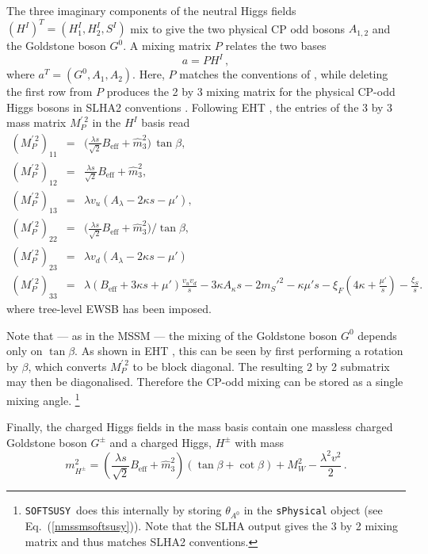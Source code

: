 \documentclass[final,3p,times]{elsarticle}
\def\SOFTSUSY{{\tt SOFTSUSY}}
\newcommand{\be}{\begin{equation}}
\newcommand{\ee}{\end{equation}}
\newcommand{\ba}{\begin{eqnarray}}
\newcommand{\ea}{\end{eqnarray}}
\newcommand{\ds}{\displaystyle}
\begin{document}
The three imaginary components of the neutral Higgs fields 
$(H^I)^T = (H^I_1, H_2^I, S^I)$ mix to give the two physical CP odd bosons 
$A_{1,2}$ and the Goldstone boson $G^0$.  A mixing matrix $P$ relates the two 
bases
%
\be 
a = P H^I\,, 
\ee
%
where $a^T = (G^0,A_1,A_2)$.  Here, $P$ matches the conventions of 
\cite{Degrassi:2009yq}, while deleting the first row from $P$ produces the 2 by
 3 mixing matrix for the physical CP-odd Higgs bosons in SLHA2 conventions \cite{Allanach:2008qq}. Following EHT \cite{Ellwanger:2009dp}, the entries of the 
3 by 3 mass matrix $ M^{\prime \, 2}_{P}$ in the $H^I$ basis read
%
\ba
( M^{\prime \, 2}_{P})_{11} & = & \Bigg(\ds\frac{\lambda s}{\sqrt{2}} B_\textrm{eff} +
\widehat{m}_3^2\Bigg)\,\tan\beta , \\
( M^{\prime \, 2}_{P})_{12} & = & \ds\frac{\lambda s}{\sqrt{2}} B_\textrm{eff} +
\widehat{m}_3^2, \\
( M^{\prime \, 2}_{P})_{13} & = & \lambda v_u (A_\lambda - 2\kappa s - \mu'), \\
( M^{\prime \, 2}_{P})_{22} & = & \Bigg(\ds\frac{\lambda s}{\sqrt{2}} B_\textrm{eff} +
\widehat{m}_3^2\Bigg)/\tan\beta ,  \\
( M^{\prime \, 2}_{P})_{23} & = & \lambda v_d (A_\lambda - 2\kappa s - \mu')\\
( M^{\prime \, 2}_{P})_{33} & = & \lambda (B_\textrm{eff}+3\kappa s +\mu')\ds\frac{v_u
v_d}{s} -3\kappa A_\kappa s  -2 m_{S}'^2 -\kappa \mu' s 
-\xi_F\left(4\kappa + \frac{\mu'}{s}\right) -\ds\frac{\xi_S}{s}.
\label{eq:MA0}
\ea
%
where tree-level EWSB has been imposed.

Note that --- as in the MSSM --- the mixing of the Goldstone boson $G^0$ depends
 only on $\tan\beta$. As shown in EHT \cite{Ellwanger:2009dp}, this can be seen 
by first performing a rotation by $\beta$, which converts $M^{\prime\, 2}_P$ to be 
block diagonal.  The resulting 2 by 2 submatrix may then be diagonalised. 
Therefore the CP-odd mixing can be stored as a single mixing angle.%
  \footnote{\SOFTSUSY~does this internally by storing $\theta_{A^0}$ in the 
    {\tt sPhysical} object (see Eq.~(\ref{nmssmsoftsusy})).  Note that the
    SLHA output 
    gives the 3 by 2 mixing matrix and thus matches SLHA2 conventions.}

Finally, the charged Higgs fields in the mass basis contain one massless 
charged Goldstone boson $G^{\pm}$ and a charged Higgs, $H^\pm$ with mass
%
\be 
m_{H^\pm}^2 = \left(\ds\frac{\lambda s}{\sqrt{2}} B_\textrm{eff} +
\widehat{m}_3^2\right)(\tan \beta + \cot \beta) + M_W^2 - \ds\frac{\lambda^2 v^2}{2}\,. 
%
\ee
  
\end{document}
